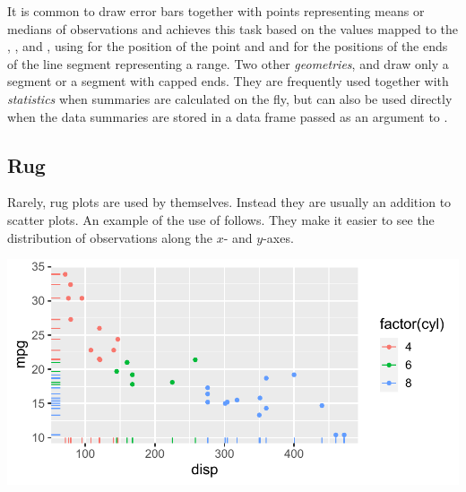 \documentclass[krantz2]{krantz}\usepackage{knitr}
\begin{document}
It is common to draw error bars together with points representing means or medians of observations and  achieves this task based on the values mapped to the , ,  and , using  for the position of the point and  and  for the positions of the ends of the line segment representing a range. Two other \emph{geometries},  and   draw only a segment or a segment with capped ends. They are frequently used together with \emph{statistics} when summaries are calculated on the fly, but can also be used directly when the data summaries are stored in a data frame passed as an argument to .

\subsection{Rug}\label{sec:plot:rug}

Rarely, rug plots are used by themselves. Instead they are usually an addition to scatter plots. An example of the use of  follows. They make it easier to see the distribution of observations
along the $x$- and $y$-axes.

\begin{knitrout}\footnotesize
{}\color{fgcolor}\begin{kframe}
\begin{alltt}
\hlstd{(} 
       \hlstd{(}     \hlstd{=}  \hlopt{+}
  \hlstd{()} \hlopt{+}
  \hlstd{()}
\end{alltt}
\end{kframe}

{\centering \includegraphics[width=.7\textwidth]{figure/pos-rug-plot-01-1} 

}



\end{knitrout}
\end{document}

